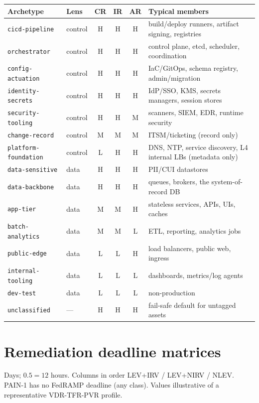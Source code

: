 \documentclass[11pt]{article}
\newcommand{\code}[1]{\texttt{#1}}
\begin{document}
\begin{table}[H]
\centering
\renewcommand{\arraystretch}{1.2}
\footnotesize
\setlength{\tabcolsep}{5pt}
\begin{tabular}{l l c c c >{\raggedright\arraybackslash}p{}}
\toprule
\textbf{Archetype} & \textbf{Lens} & \textbf{CR} & \textbf{IR} & \textbf{AR} & \textbf{Typical members} \\
\midrule
\code{cicd-pipeline}      & control & H & H & H & build/deploy runners, artifact signing, registries \\
\code{orchestrator}       & control & H & H & H & control plane, etcd, scheduler, coordination \\
\code{config-actuation}   & control & H & H & H & IaC/GitOps, schema registry, admin/migration \\
\code{identity-secrets}   & control & H & H & H & IdP/SSO, KMS, secrets managers, session stores \\
\code{security-tooling}   & control & H & H & M & scanners, SIEM, EDR, runtime security \\
\code{change-record}      & control & M & M & M & ITSM/ticketing (record only) \\
\code{platform-foundation}& control & L & H & H & DNS, NTP, service discovery, L4 internal LBs (metadata only) \\
\code{data-sensitive}     & data    & H & H & H & PII/CUI datastores \\
\code{data-backbone}      & data    & H & H & H & queues, brokers, the system-of-record DB \\
\code{app-tier}           & data    & M & M & H & stateless services, APIs, UIs, caches \\
\code{batch-analytics}    & data    & M & M & L & ETL, reporting, analytics jobs \\
\code{public-edge}        & data    & L & L & H & load balancers, public web, ingress \\
\code{internal-tooling}   & data    & L & L & L & dashboards, metrics/log agents \\
\code{dev-test}           & data    & L & L & L & non-production \\
\midrule
\code{unclassified}       & ---     & H & H & H & fail-safe default for untagged assets \\
\bottomrule
\end{tabular}
\end{table}

\section{Remediation deadline matrices}
\label{app:matrix}
Days; $0.5 = 12$ hours. Columns in order LEV+IRV / LEV+NIRV / NLEV. PAIN-1 has no
FedRAMP deadline (any class). Values illustrative of a representative VDR-TFR-PVR
profile.
\end{document}
